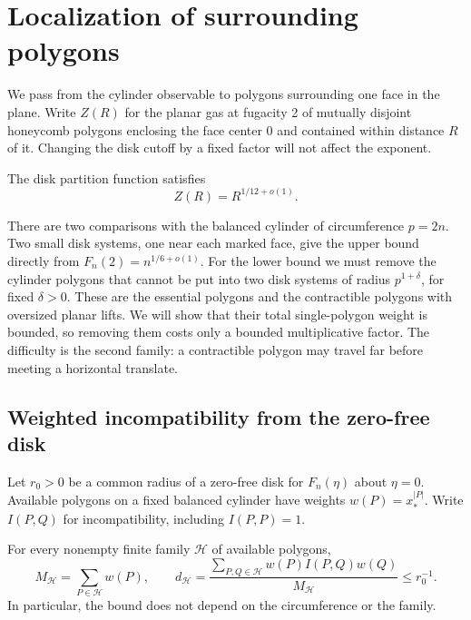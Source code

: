 \section{Localization of surrounding polygons}\label{c01-c1-localization-of-surrounding-polygons}

We pass from the cylinder observable to polygons surrounding one face in the
plane. Write \(Z(R)\) for the planar gas at fugacity 2 of mutually disjoint
honeycomb polygons enclosing the face center 0 and contained within distance
\(R\) of it. Changing the disk cutoff by a fixed factor will not affect the
exponent.

\begin{proposition}\label{prop:pv:planar-localization}
The disk partition function satisfies
\[
 Z(R)=R^{1/12+o(1)}.
\]
\end{proposition}

There are two comparisons with the balanced cylinder of circumference
\(p=2n\). Two small disk systems, one near each marked face, give the upper
bound directly from \(F_n(2)=n^{1/6+o(1)}\). For the lower bound we must remove
the cylinder polygons that cannot be put into two disk systems of radius
\(p^{1+\delta}\), for fixed \(\delta>0\). These are the essential polygons
and the contractible polygons with oversized planar lifts. We will show that
their total single-polygon weight is bounded, so removing them costs only a
bounded multiplicative factor. The difficulty is the second family: a
contractible polygon may travel far before meeting a horizontal translate.

\subsection{Weighted incompatibility from the zero-free disk}

Let \(r_0>0\) be a common radius of a zero-free disk for \(F_n(\eta)\) about
\(\eta=0\). Available polygons on a fixed balanced cylinder have weights
\(w(P)=x_*^{|P|}\). Write \(I(P,Q)\) for incompatibility, including
\(I(P,P)=1\).

\begin{lemma}\label{lem:pv:weighted-degree}
For every nonempty finite family \(\mathcal H\) of available polygons,
\[
 M_{\mathcal H}=\sum_{P\in\mathcal H}w(P),\qquad
 d_{\mathcal H}
 =\frac{\sum_{P,Q\in\mathcal H}w(P)I(P,Q)w(Q)}{M_{\mathcal H}}
 \le r_0^{-1}.
\]
In particular, the bound does not depend on the circumference or the family.
\end{lemma}

